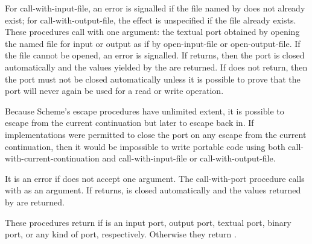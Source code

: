 \begin{entry}{%
}

For {\cf call-with-input-file},
an error is signalled if
the file named by  does not already exist; for
{\cf call-with-output-file},
the effect is unspecified if the file
already exists. These procedures call  with one argument: the
textual port obtained by opening the named file for input or output
as if by {\cf open-input-file} or {\cf open-output-file}.  If the
file cannot be opened, an error is signalled.  If  returns,
then the port is closed automatically and the values yielded by the
 are returned.  If  does not return, then 
the port must not be closed automatically unless it is possible to
prove that the port will never again be used for a read or write
operation.

\begin{rationale}
Because Scheme's escape procedures have unlimited extent, it  is
possible to escape from the current continuation but later to escape back in. 
If implementations were permitted to close the port on any escape from the
current continuation, then it would be impossible to write portable code using
both {\cf call-with-current-continuation} and {\cf call-with-input-file} or
{\cf call-with-output-file}.
\end{rationale} 
\end{entry}

\begin{entry}{%
}

It is an error if  does not accept one argument.  The {\cf call-with-port}
procedure calls  with  as an argument.  If
 returns,  is closed automatically and the values
returned by  are returned.

\end{entry}

\begin{entry}{%
}

These procedures return \schtrue{} if  is an input port, output port, 
textual port, binary port, or any
kind of port, respectively.  Otherwise they return \schfalse.

\end{entry}



